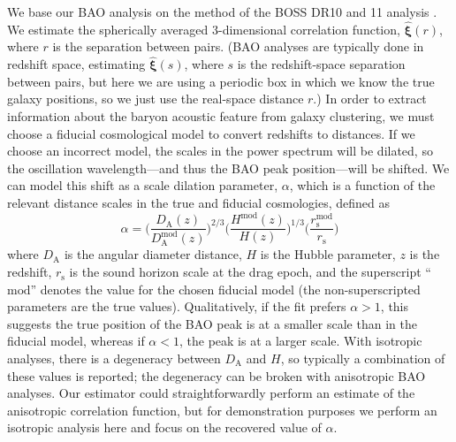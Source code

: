 \documentclass[modern]{aastex62}
\newcommand{\bld}[1]{\bm{#1}} %
\begin{document}
We base our BAO analysis on the method of the BOSS DR10 and 11 analysis \citep{Anderson2014}.
We estimate the spherically averaged 3-dimensional correlation function, $\bld{\hat{\xi}}(r)$, where $r$ is the separation between pairs.
(BAO analyses are typically done in redshift space, estimating $\bld{\hat{\xi}}(s)$, where $s$ is the redshift-space separation between pairs, but here we are using a periodic box in which we know the true galaxy positions, so we just use the real-space distance $r$.)
In order to extract information about the baryon acoustic feature from galaxy clustering, we must choose a fiducial cosmological model to convert redshifts to distances.
If we choose an incorrect model, the scales in the power spectrum will be dilated, so the oscillation wavelength---and thus the BAO peak position---will be shifted.
We can model this shift as a scale dilation parameter, $\alpha$, which is a function of the relevant distance scales in the true and fiducial cosmologies, defined as
\begin{equation} \label{eq:alpha}
\alpha = \Bigg( \frac{D_\mathrm{A}(z)}{D_\mathrm{A}^{\text{mod}}(z)} \Bigg)^{2/3} \Bigg( \frac{H^{\text{mod}}(z)}{H(z)} \Bigg)^{1/3} \Bigg( \frac{r_\mathrm{s}^{\text{mod}}}{r_\mathrm{s}} \Bigg)
\end{equation}
where $D_\mathrm{A}$ is the angular diameter distance, $H$ is the Hubble parameter, $z$ is the redshift, $r_\mathrm{s}$ is the sound horizon scale at the drag epoch, and the superscript ``$\text{mod}$'' denotes the value for the chosen fiducial model (the non-superscripted parameters are the true values).
Qualitatively, if the fit prefers $\alpha>1$, this suggests the true position of the BAO peak is at a smaller scale than in the fiducial model, whereas if $\alpha<1$, the peak is at a larger scale.
With isotropic analyses, there is a degeneracy between $D_\mathrm{A}$ and $H$, so typically a combination of these values is reported; the degeneracy can be broken with anisotropic BAO analyses.
Our estimator could straightforwardly perform an estimate of the anisotropic correlation function, but for demonstration purposes we perform an isotropic analysis here and focus on the recovered value of $\alpha$.
\end{document}
